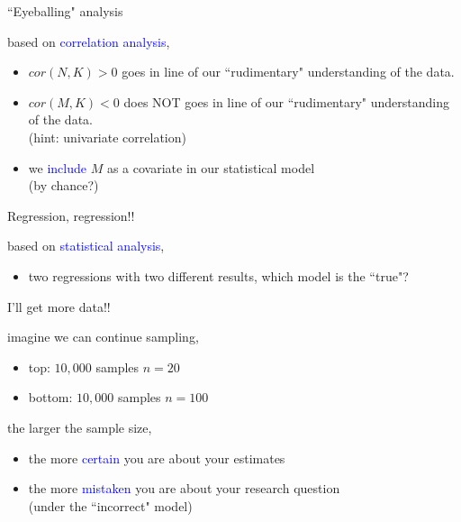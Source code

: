 %
%
\begin{lhframe}[rhgraphic={\texttt{[image: fork4\_panel.pdf]}}]
	{``Eyeballing" analysis}
	
	based on \textcolor{blue}{correlation analysis},
	\begin{itemize}
		\item $cor(N, K)>0$ goes in line of our ``rudimentary" understanding of the data.
		\item $cor(M, K)<0$ does NOT goes in line of our ``rudimentary" understanding of the data. \\
		{\small (hint: univariate correlation)}
		\item we \textcolor{blue}{include} $M$ as a covariate in our statistical model \\
		{\small (by chance?)}
	\end{itemize}
\end{lhframe}
%
%
\begin{lhframe}[rhgraphic={\texttt{[image: fork4\_reg.png]}}]
	{Regression, regression!!}
	
	based on \textcolor{blue}{statistical analysis},
	\begin{itemize}
		\item two regressions with two different results, which model is the ``true"?
	\end{itemize}
\end{lhframe}
%
%
\begin{lhframe}[rhgraphic={\texttt{[image: fork4\_samplesize.pdf]}}]
	{I'll get more data!!}
	
	imagine we can continue sampling,
	\begin{itemize}
		\item top: $10,000$ samples $n=20$
		\item bottom: $10,000$ samples $n=100$
	\end{itemize}
	
	the larger the sample size,
	\begin{itemize}
		\item the more \textcolor{blue}{certain} you are about your estimates
		\item the more \textcolor{blue}{mistaken} you are about your research question \\
		{\small (under the ``incorrect" model)}
	\end{itemize}
\end{lhframe}
%
%
